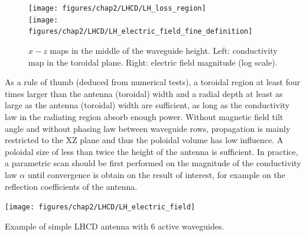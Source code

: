\begin{figure}[h]
	\centering
	\texttt{[image: figures/chap2/LHCD/LH\_loss\_region]}\\
	\texttt{[image: figures/chap2/LHCD/LH\_electric\_field\_fine\_definition]}
	\caption{$x-z$ maps in the middle of the waveguide height. Left: conductivity map in the toroidal plane. Right: electric field magnitude (log scale).}
	\label{fig:LH_HFSS}
\end{figure}

As a rule of thumb (deduced from numerical tests), a toroidal region at least four times larger than the antenna (toroidal) width and a radial depth at least as large as the antenna (toroidal) width are sufficient, as long as the conductivity law in the radiating region absorb enough power. Without magnetic field tilt angle and without phasing law between waveguide rows, propagation is mainly restricted to the XZ plane and thus the poloidal volume has low influence. A poloidal size of less than twice the height of the antenna is sufficient. In practice, a parametric scan should be first performed on the magnitude of the conductivity law  $\alpha$ until convergence is obtain on the result of interest, for example on the reflection coefficients of the antenna.

\begin{marginfigure}
	\centering
	\texttt{[image: figures/chap2/LHCD/LH\_electric\_field]}
	\caption{Example of simple LHCD antenna with 6 active waveguides.}
	\label{fig:lhelectricfield}
\end{marginfigure}


